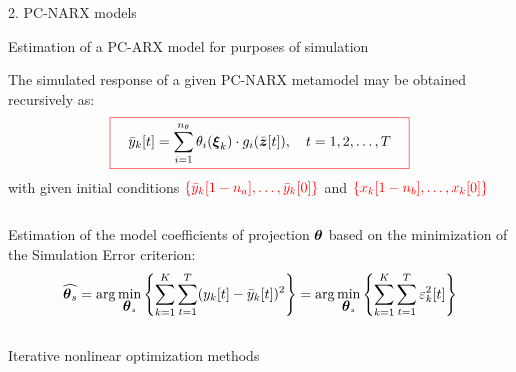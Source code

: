 \documentclass[10pt,xcolor = dvipsnames]{beamer}
\newcommand{\bc}{\begin{center}}
\newcommand{\ec}{\end{center}}
\newcommand{\vc}[1]{\vspace*{#1cm}}
\newcommand{\bth}{\bld{\theta}}
\newcommand{\bld}[1]{\mbox{\boldmath $#1$}}
\newcommand{\bxi}{\bld{\xi}}
\newcommand{\Blue}{\color{blue}}
\newcommand{\Red}{\color{red}}
\newcommand{\Black}{\color{black}}
\begin{document}
\begin{frame}{2. PC-NARX models}

\vc{-0.1}\begin{block}{Estimation of a PC-ARX model for purposes of simulation}

\small 

\bc The simulated response of a given PC-NARX metamodel may be obtained recursively as:
% 
$$ 
\Red\boxed{\Black \quad \bar{y}_k[t] = \sum_{i=1}^{n_\theta} \theta_i (\bxi_k) \cdot g_i(\bar{\bld z}[t]) , \quad t = 1,2,\ldots, T \quad}
$$
%
{\footnotesize with given initial conditions $\Red\{ \bar{y}_k[1 - n_a], \ldots, \bar{y}_k[0] \}$ and $\Red \{ x_k[1-n_b], \ldots, x_k[0]\}$} \ec

\begin{columns}
\begin{block}{}
\centering
Estimation of the model coefficients of projection $\bth$ based on the {\Blue minimization} of the {\Red Simulation Error} criterion:
%
$$\widehat{\bth_s} = \arg\min_{\bth_s} \left\{ \sum_{k=1}^K \sum_{t=1}^T  (y_k[t]- \bar{y}_k[t] )^2 \right\}  =\arg\min_{\bth_s} \left\{ \sum_{k=1}^K \sum_{t=1}^T  \varepsilon_k^2[t] \right\}$$
%
\end{block}
\end{columns}
%
\vc{-0.2}{\LARGE \Red $$ \Downarrow$$}\vc{-0.5}
%
\begin{columns}
\begin{block}{}
\small \bc Iterative {\Blue nonlinear optimization} methods\ec
\end{block}
\vc{0.2}
\end{columns}

\end{block}

\end{frame}
\end{document}
